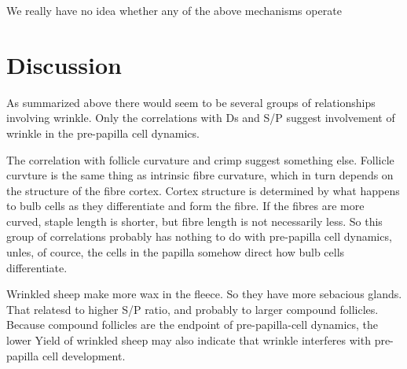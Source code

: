 \documentclass[titlepage]{article}  %
\begin{document}
We really have no idea whether any of the above mechanisms operate

\section{Discussion}
As summarized above there would seem to be several groups of relationships involving wrinkle. Only the correlations with Ds and S/P suggest involvement of wrinkle in the pre-papilla cell dynamics. 

The correlation with follicle curvature and crimp suggest something else. Follicle curvture is the same thing as intrinsic fibre curvature, which in turn depends on the structure of the fibre cortex. Cortex structure is determined by what happens to bulb cells as they differentiate and form the fibre. If the fibres are more curved, staple length is shorter, but fibre length is not necessarily less. So this group of correlations probably has nothing to do with pre-papilla cell dynamics, unles, of cource, the cells in the papilla somehow direct how bulb cells differentiate.

Wrinkled sheep make more wax in the fleece. So they have more sebacious glands. That relatesd to higher S/P ratio, and probably to larger compound follicles. Because compound follicles are the endpoint of pre-papilla-cell dynamics, the  lower Yield of wrinkled sheep may also indicate that wrinkle interferes with pre-papilla cell development.
\end{document}
